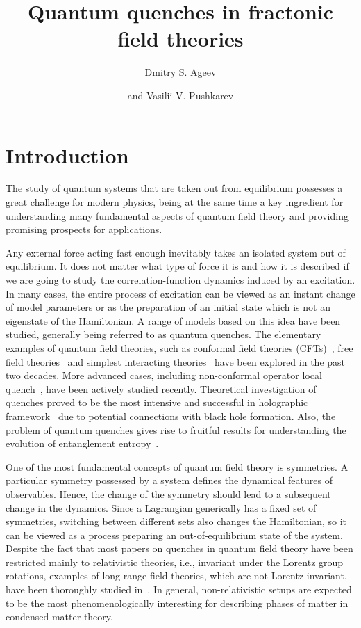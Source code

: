 \documentclass[a4paper,12pt]{article}
\title{Quantum quenches in fractonic field theories}
\author{Dmitry S. Ageev}
\author{and Vasilii V. Pushkarev}
\affiliation{Steklov Mathematical Institute, Russian Academy of Sciences,\\
Gubkin str. 8, 119991 Moscow, Russian Federation}
\begin{document}
 
\maketitle
\flushbottom

\section{Introduction}

The study of quantum systems that are taken out from equilibrium possesses a great challenge for modern physics, being at the same time a key ingredient for understanding many fundamental aspects of quantum field theory and providing promising prospects for applications.

Any external force acting fast enough inevitably takes an isolated system out of equilibrium. It does not matter what type of force it is and how it is described if we are going to study the correlation-function dynamics induced by an excitation. In many cases, the entire process of excitation can be viewed as an instant change of model parameters or as the preparation of an initial state which is not an eigenstate of the Hamiltonian. A range of models based on this idea have been studied, generally being referred to as quantum quenches. The elementary examples of quantum field theories, such as conformal field theories (CFTs)~\cite{Calabrese:2006rx, Calabrese:2007rg, Das:2014hqa, Calabrese:2016xau}, free field theories~\cite{Sotiriadis2009thermal, Rajabpour:2014osa, Das:2015jka, Das:2016lla} and simplest interacting theories~\cite{Sotiriadis:2010si} have been explored in the past two decades. More advanced cases, including non-conformal operator local quench~\cite{He:2019vzf, Ageev:2022kpm}, have been actively studied recently. Theoretical investigation of quenches proved to be the most intensive and successful in holographic framework~\cite{Danielsson:1999fa, Balasubramanian:2010ce, Balasubramanian:2011ur, Buchel:2013gba, Asplund:2014coa, Ageev:2017oku, Ageev:2017wet} due to potential connections with black hole formation. Also, the problem of quantum quenches gives rise to fruitful results for understanding the evolution of entanglement entropy~\cite{Calabrese:2005in, Nozaki:2014hna, He:2014mwa, Caputa:2014eta, Cotler:2016acd}.

One of the most fundamental concepts of quantum field theory is symmetries. A particular symmetry possessed by a system defines the dynamical features of observables. Hence, the change of the symmetry should lead to a subsequent change in the dynamics. Since a Lagrangian generically has a fixed set of symmetries, switching between different sets also changes the Hamiltonian, so it can be viewed as a process preparing an out-of-equilibrium state of the system. Despite the fact that most papers on quenches in quantum field theory have been restricted mainly to relativistic theories, i.e., invariant under the Lorentz group rotations, examples of long-range field theories, which are not Lorentz-invariant, have been thoroughly studied in~\cite{Rajabpour:2014osa}. In general, non-relativistic setups are expected to be the most phenomenologically interesting for describing phases of matter in condensed matter theory.
\end{document}
